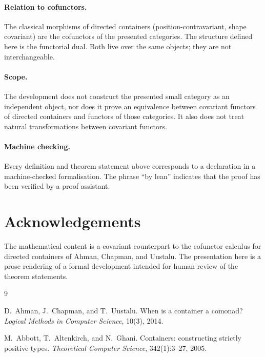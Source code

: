 \documentclass[11pt,a4paper]{article}
\theoremstyle{plain}
\theoremstyle{definition}
\begin{document}
\paragraph{Relation to cofunctors.}
The classical morphisms of directed containers (position-contravariant, shape
covariant) are the cofunctors of the presented categories. The structure
defined here is the functorial dual. Both live over the same objects; they are
not interchangeable.

\paragraph{Scope.}
The development does not construct the presented small category as an
independent object, nor does it prove an equivalence between covariant
functors of directed containers and functors of those categories. It also does
not treat natural transformations between covariant functors.

\paragraph{Machine checking.}
Every definition and theorem statement above corresponds to a declaration in a
machine-checked formalisation. The phrase ``by lean'' indicates that the proof
has been verified by a proof assistant.

\section*{Acknowledgements}

The mathematical content is a covariant counterpart to the cofunctor calculus
for directed containers of Ahman, Chapman, and Uustalu. The presentation here
is a prose rendering of a formal development intended for human review of the
theorem statements.

\begin{thebibliography}{9}

D.~Ahman, J.~Chapman, and T.~Uustalu.
\newblock When is a container a comonad?
\newblock \emph{Logical Methods in Computer Science}, 10(3), 2014.

M.~Abbott, T.~Altenkirch, and N.~Ghani.
\newblock Containers: constructing strictly positive types.
\newblock \emph{Theoretical Computer Science}, 342(1):3--27, 2005.

\end{thebibliography}
\end{document}
